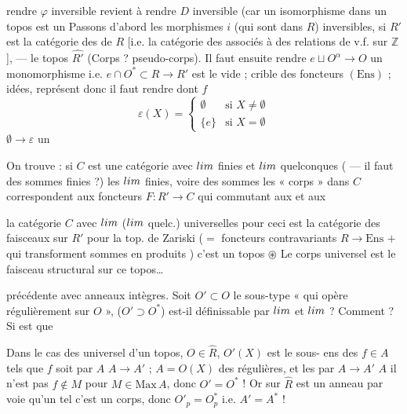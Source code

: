 \documentclass[11pt,a4paper]{article}
\begin{document}
rendre $\varphi$ inversible revient à rendre $D$ inversible (car un
\struck{\ill{}} isomorphisme dans un topos est un \ill{} \struck{\ill{}}
Passons d'abord  les morphismes $i$ (qui sont dans $R$)
inversibles, \ill{} si $R'$ est \struck{\ill{}} la catégorie des
 de $R$ [i.e. la catégorie des \ill{} associés à des
relations de v.f. sur $\mathbb{Z}$], — \ill{} le topos $\hat{R'}$ (Corps ?
\ill{} pseudo-corps). Il faut ensuite rendre $e \sqcup O^{\alpha} \to O$
 un monomorphisme i.e. $e \cap O^{*}
\subset R \to R'$ est le \struck{\ill{}} vide ; \ill{} crible \ill{} des
\ill{} foncteurs $(\mathrm{Ens})$ \ill{} ; idées, représent\ill{} donc il
faut rendre \ill{} \struck{\ill{}} dont $f$
\[
  \varepsilon(X) =
  \begin{cases}
    \emptyset & \text{si } X \neq \emptyset \\
    \{e\} & \text{si } X = \emptyset
  \end{cases}
\]
$\emptyset \to \varepsilon$  un
\ill{}

On trouve : si $C$ est une catégorie avec $\varprojlim$ finies et
$\varinjlim$ quelconques ( — il faut \ill{} des sommes
finies ?) \struck{\ill{}} \ill{} les $\varinjlim$ finies, voire des sommes
\ill{} \struck{\ill{}} \ill{} les « corps » dans $C$ correspondent aux
foncteurs $F : R' \to C$ qui \struck{\ill{}} \ill{} commutant aux \ill{}
 et aux  \ill{}

la catégorie $C$ avec $\varprojlim$ ($\varinjlim$ quelc.) universelles
pour ceci est la catégorie des faisceaux sur $R'$ pour la top. de Zariski
($=$ foncteurs contravariants $R \to \mathrm{Ens}$ $+$ \ill{} qui
transforment sommes en produits \ill{}) c'est un topos $\circledast$ Le
corps universel est le faisceau structural sur ce topos…

 \ill{} précédente avec anneaux intègres. Soit
$O' \subset O$ le sous-type « qui opère régulièrement sur $O$ », ($O'
\supset O^{*}$) est-il définissable par $\varprojlim$ et $\varinjlim$ ?
Comment \ill{} \struck{\ill{}} ? Si  \ill{} est \ill{}
\struck{\ill{}} \ill{} que \ill{} \ill{} \struck{\ill{}} 

Dans le cas des \ill{} universel d'un topos, $O \in \hat{R}$, $O'(X)$ est
le sous-\ill{} ens des $f \in A$ tels que $f$ soit \ill{} par $A$ \ill{}
$A \to A'$ ; $A = O(X)$ \ill{} des \ill{} régulières, et les
 \ill{} par $A \to A'$ $A$ \ill{} il n'est pas \ill{}
\ill{} $f \notin M$ pour $M \in \mathrm{Max}\,A$, donc $O' = O^{*}$ ! Or
sur $\hat{R}$ est un anneau \ill{} par voie \ill{} qu'un tel \ill{}
\ill{} c'est un corps, donc $O'_{p} = O^{*}_{p}$ i.e. $A' = A^{*}$ !
\end{document}
